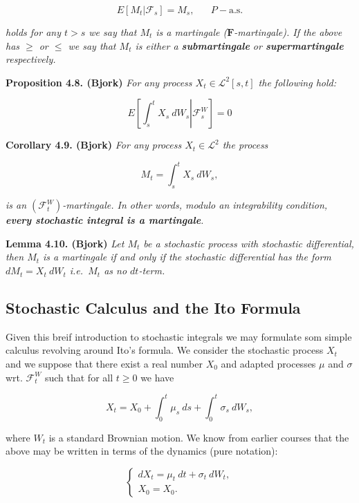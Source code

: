 \documentclass[a4paper,12pt,openany]{book}
\begin{document}
\[E[M_t\vert \mathcal{F}_s]=M_s,\hspace{20pt}P-\text{a.s.}\]

\emph{holds for any \(t>s\) we say that \(M_t\) is a martingale (\(\mathbf{F}\)-martingale). If the above has \(\ge\) or \(\le\) we say that \(M_t\) is either a \textbf{submartingale} or \textbf{supermartingale} respectively.}

\textbf{Proposition 4.8. (Bjork)} \emph{For any process \(X_t\in\mathcal{L}^2[s,t]\) the following hold:}

\[
E\left[\left.\int_s^t X_s\ dW_s\right\vert\mathcal{F}_s^W\right]=0
\]

\textbf{Corollary 4.9. (Bjork)} \emph{For any process \(X_t\in\mathcal{L}^2\) the process}

\[
M_t=\int_s^t X_s\ dW_s,
\]

\emph{is an \((\mathcal{F}_t^W)\)-martingale. In other words, modulo an integrability condition, \textbf{every stochastic integral is a martingale}.}

\textbf{Lemma 4.10. (Bjork)} \emph{Let \(M_t\) be a stochastic process with stochastic differential, then \(M_t\) is a martingale if and only if the stochastic differential has the form \(dM_t=X_t\ dW_t\) i.e.~\(M_t\) as no \(dt\)-term.}

\hypertarget{stochastic-calculus-and-the-ito-formula}{%
\subsection{Stochastic Calculus and the Ito Formula}\label{stochastic-calculus-and-the-ito-formula}}

Given this breif introduction to stochastic integrals we may formulate som simple calculus revolving around Ito's formula. We consider the stochastic process \(X_t\) and we suppose that there exist a real number \(X_0\) and adapted processes \(\mu\) and \(\sigma\) wrt. \(\mathcal{F}_t^W\) such that for all \(t\ge0\) we have

\[
X_t=X_0+\int_0^t\mu_s\ ds+\int_0^t\sigma_s\ dW_s,\tag{4.16}
\]

where \(W_t\) is a standard Brownian motion. We know from earlier courses that the above may be written in terms of the dynamics (pure notation):

\[
\left\{\begin{matrix}dX_t=\mu_t\ dt+\sigma_t\ dW_t,\tag{4.17/18}\\ X_0=X_0.\end{matrix}\right.
\]
\end{document}
